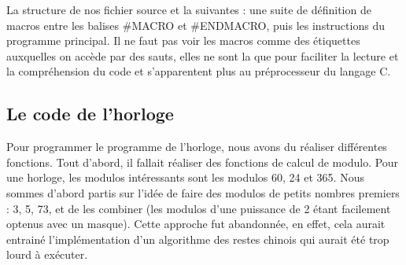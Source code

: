 \documentclass[a4paper, 12pt, twoside]{report}
\begin{document}
La structure de nos fichier source et la suivantes : une suite de définition de macros 
entre les balises \#MACRO et \#ENDMACRO, puis les instructions du programme principal. 
Il ne faut pas voir les macros comme des étiquettes auxquelles on accède par des sauts, 
elles ne sont la que pour faciliter la lecture et la compréhension du code et s'apparentent 
plus au préprocesseur du langage C.\\

\subsection{Le code de l'horloge}

Pour programmer le programme de l'horloge, nous avons du réaliser différentes fonctions.
Tout d'abord, il fallait réaliser des fonctions de calcul de modulo. Pour une horloge, les 
modulos intéressants sont les modulos 60, 24 et 365. Nous sommes d'abord partis 
sur l'idée de faire des modulos de petits nombres premiers : 3, 5, 73, et de les combiner (les 
modulos d'une puissance de 2 étant facilement optenus avec un masque). Cette approche fut 
abandonnée, en effet, cela aurait entrainé l'implémentation d'un algorithme des restes chinois 
qui aurait été trop lourd à exécuter.\\
\end{document}
